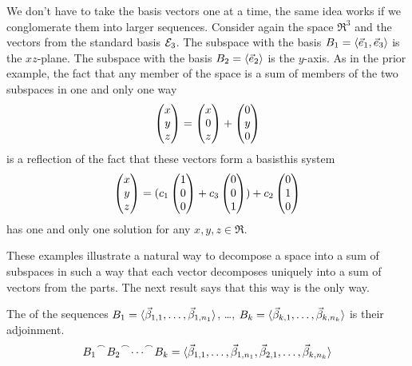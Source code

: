 \begin{example}
We don't have to take the basis vectors one at a time, the same idea works if
we conglomerate them into larger sequences.
Consider again the space $\Re^3$ and the vectors from the standard basis ${\cal E}_3$.
The subspace with the basis $B_1=\langle\vec{e}_1,\vec{e}_3\rangle$
is the $xz$-plane.
The subspace with the basis $B_2=\langle\vec{e}_2\rangle$ is the $y$-axis.
As in the prior example, the fact that any member of the space is a sum of
members of the two subspaces in one and only one way
\begin{equation*}
  \begin{pmatrix} x \\ y \\ z \end{pmatrix}
   =\begin{pmatrix} x \\ 0 \\ z \end{pmatrix}
    +\begin{pmatrix} 0 \\ y \\ 0 \end{pmatrix}
\end{equation*}
is a reflection of the fact that these vectors form a
basis\Dash this system
\begin{equation*}
  \begin{pmatrix} x \\ y \\ z \end{pmatrix}
   =(c_1\begin{pmatrix} 1 \\ 0 \\ 0 \end{pmatrix}
    +c_3\begin{pmatrix} 0 \\ 0 \\ 1 \end{pmatrix})
    +c_2\begin{pmatrix} 0 \\ 1 \\ 0 \end{pmatrix}
\end{equation*}
has one and only one solution for any $x,y,z\in\Re$.
\end{example}

These examples illustrate 
a natural way to decompose a space into a sum of subspaces in such a way that
each vector decomposes uniquely into a sum of vectors from the parts.
The next result says that this way is the only way.

\begin{definition}
The %
of the sequences
$
   B_1=\langle\vec{\beta}_{1,1},\dots,\vec{\beta}_{1,n_1}\rangle$, 
  \ldots,
  $B_k=\langle\vec{\beta}_{k,1},\dots,\vec{\beta}_{k,n_k}\rangle$ 
is their adjoinment.
\begin{equation*}
 \cat{\cat{\cat{B_1}{B_2}}{\cdots}}{B_k}=
   \sequence{\vec{\beta}_{1,1},\dots,\vec{\beta}_{1,n_1},
            \vec{\beta}_{2,1},\dots,\vec{\beta}_{k,n_k} } 
\end{equation*}
\end{definition}

